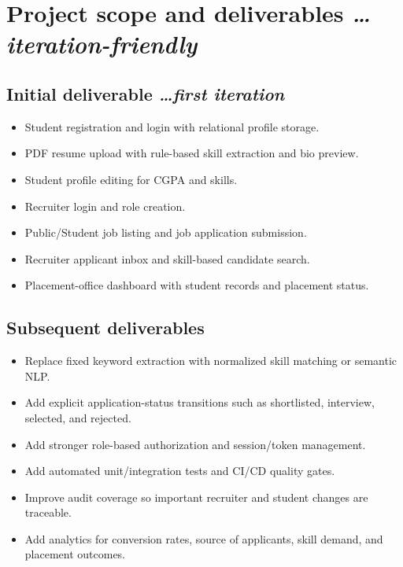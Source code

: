 \documentclass[11pt,a4paper]{article}
\newcommand{\BvrHint}[1]{%
  {\normalfont\normalsize\itshape\hfill #1}}
\begin{document}
\section{Project scope and deliverables\BvrHint{\ldots iteration-friendly}}
\subsection{Initial deliverable\BvrHint{\ldots first iteration}}
\begin{itemize}[leftmargin=0.7cm]
    \item Student registration and login with relational profile storage.
    \item PDF resume upload with rule-based skill extraction and bio preview.
    \item Student profile editing for CGPA and skills.
    \item Recruiter login and role creation.
    \item Public/Student job listing and job application submission.
    \item Recruiter applicant inbox and skill-based candidate search.
    \item Placement-office dashboard with student records and placement status.
\end{itemize}

\subsection{Subsequent deliverables}
\begin{itemize}[leftmargin=0.7cm]
    \item Replace fixed keyword extraction with normalized skill matching or semantic NLP.
    \item Add explicit application-status transitions such as shortlisted, interview, selected, and rejected.
    \item Add stronger role-based authorization and session/token management.
    \item Add automated unit/integration tests and CI/CD quality gates.
    \item Improve audit coverage so important recruiter and student changes are traceable.
    \item Add analytics for conversion rates, source of applicants, skill demand, and placement outcomes.
\end{itemize}
\end{document}
